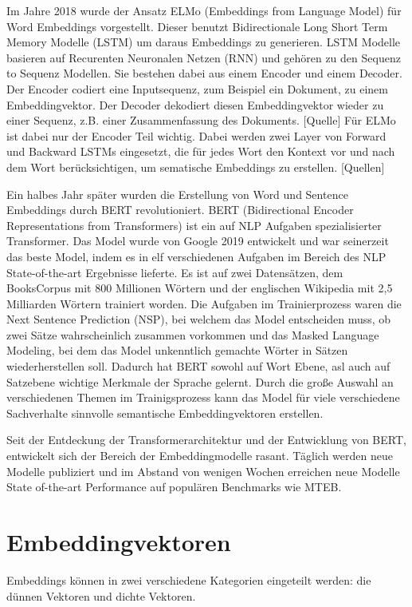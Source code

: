 Im Jahre 2018 wurde der Ansatz ELMo (Embeddings from Language Model) für Word Embeddings vorgestellt.
Dieser benutzt Bidirectionale Long Short Term Memory Modelle (LSTM) um daraus Embeddings zu generieren.
LSTM Modelle basieren auf Recurenten Neuronalen Netzen (RNN) und gehören zu den Sequenz to Sequenz Modellen. 
Sie bestehen dabei aus einem Encoder und einem Decoder.
Der Encoder codiert eine Inputsequenz, zum Beispiel ein Dokument, zu einem Embeddingvektor. 
Der Decoder dekodiert diesen Embeddingvektor wieder zu einer Sequenz, z.B. einer Zusammenfassung des Dokuments. [Quelle]
Für ELMo ist dabei nur der Encoder Teil wichtig.
Dabei werden zwei Layer von Forward und Backward LSTMs eingesetzt, die für jedes Wort den Kontext vor und nach dem Wort berücksichtigen, um sematische Embeddings zu erstellen. [Quellen]

Ein halbes Jahr später wurden die Erstellung von Word und Sentence Embeddings durch BERT revolutioniert.
BERT (Bidirectional Encoder Representations from Transformers) \cite{devlin2019} ist ein auf NLP Aufgaben spezialisierter Transformer.
Das Model wurde von Google 2019 entwickelt und war seinerzeit das beste Model, indem es in elf verschiedenen Aufgaben im Bereich des NLP State-of-the-art Ergebnisse lieferte.
Es ist auf zwei Datensätzen, dem BooksCorpus mit 800 Millionen Wörtern und der englischen Wikipedia mit 2,5 Milliarden Wörtern trainiert worden. 
Die Aufgaben im Trainierprozess waren die Next Sentence Prediction (NSP), bei welchem das Model entscheiden muss, ob zwei Sätze wahrscheinlich zusammen vorkommen und das Masked Language Modeling, bei dem das Model unkenntlich gemachte Wörter in Sätzen wiederherstellen soll.
Dadurch hat BERT sowohl auf Wort Ebene, asl auch auf Satzebene wichtige Merkmale der Sprache gelernt.
Durch die große Auswahl an verschiedenen Themen im Trainigsprozess kann das Model für viele verschiedene Sachverhalte sinnvolle semantische Embeddingvektoren erstellen.
\cite{devlin2019}


Seit der Entdeckung der Transformerarchitektur und der Entwicklung von BERT, entwickelt sich der Bereich der Embeddingmodelle rasant.
Täglich werden neue Modelle publiziert und im Abstand von wenigen Wochen erreichen neue Modelle State of-the-art Performance auf populären Benchmarks wie MTEB.  


\section{Embeddingvektoren}


Embeddings können in zwei verschiedene Kategorien eingeteilt werden: die dünnen Vektoren und dichte Vektoren.

